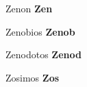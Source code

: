 \begin{footnotesize}
\begin{description}[%
				style=nextline,
				leftmargin=2cm,
				font=\normalfont]
\item[Zen.] Zenon \newline \textbf{Zen}
\item[Zenob.] Zenobios \newline \textbf{Zenob}
\item[Zenod.] Zenodotos \newline \textbf{Zenod}
\item[Zos.] Zosimos \newline \textbf{Zos}

\end{description}
\end{footnotesize}
